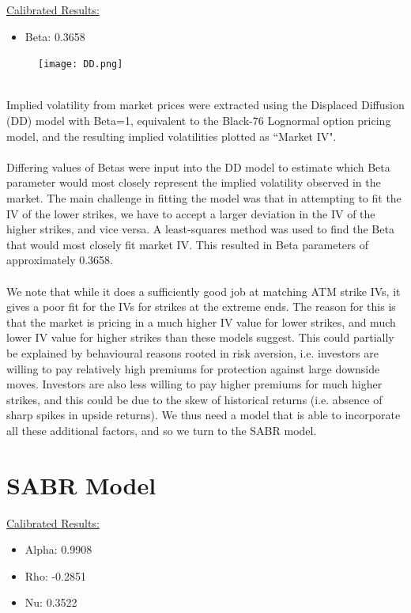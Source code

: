 \documentclass{article}
\begin{document}
\underline{Calibrated Results:}
\begin{itemize}
	\item Beta: 0.3658
\end{itemize}

\begin{figure}[ht]
	\centering
	\texttt{[image: DD.png]}
\end{figure}
\noindent\\
Implied volatility from market prices were extracted using the Displaced Diffusion (DD) model with Beta=1, equivalent to the Black-76 Lognormal option pricing model, and the resulting implied volatilities plotted as ``Market IV".\\
\noindent\\
Differing values of Betas were input into the DD model to estimate which Beta parameter would most closely represent the implied volatility observed in the market. The main challenge in fitting the model was that in attempting to fit the IV of the lower strikes, we have to accept a larger deviation in the IV of the higher strikes, and vice versa. A least-squares method was used to find the Beta that would most closely fit market IV. This resulted in Beta parameters of approximately 0.3658.\\
\noindent\\
We note that while it does a sufficiently good job at matching ATM strike IVs, it gives a poor fit for the IVs for strikes at the extreme ends. The reason for this is that the market is pricing in a much higher IV value for lower strikes, and much lower IV value for higher strikes than these models suggest. This could partially be explained by behavioural reasons rooted in risk aversion, i.e. investors are willing to pay relatively high premiums for protection against large downside moves. Investors are also less willing to pay higher premiums for much higher strikes, and this could be due to the skew of historical returns (i.e. absence of sharp spikes in upside returns). We thus need a model that is able to incorporate all these additional factors, and so we turn to the SABR model. \\


\section{SABR Model}
\underline{Calibrated Results:}

\begin{itemize}
	\item Alpha: 0.9908
	\item Rho: -0.2851
	\item Nu: 0.3522
\end{itemize}
\end{document}
